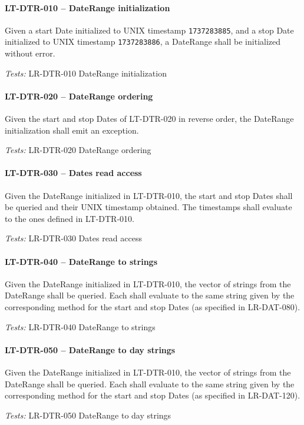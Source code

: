 \paragraph{LT-DTR-010 -- DateRange initialization}
Given a start Date initialized to UNIX timestamp \lstinline{1737283885},
and a stop Date initialized to UNIX timestamp \lstinline{1737283886},
a DateRange shall be initialized without error.

\textit{Tests: } LR-DTR-010 DateRange initialization

\paragraph{LT-DTR-020 -- DateRange ordering}
Given the start and stop Dates of LT-DTR-020 in reverse order,
the DateRange initialization shall emit an exception.

\textit{Tests: } LR-DTR-020 DateRange ordering

\paragraph{LT-DTR-030 -- Dates read access}
Given the DateRange initialized in LT-DTR-010, the start and stop
Dates shall be queried and their UNIX timestamp obtained.
The timestamps shall evaluate to the ones defined in LT-DTR-010.

\textit{Tests: } LR-DTR-030 Dates read access

\paragraph{LT-DTR-040 -- DateRange to strings}
Given the DateRange initialized in LT-DTR-010, the vector of
strings from the DateRange shall be queried. Each shall evaluate
to the same string given by the corresponding method for the start and stop
Dates (as specified in LR-DAT-080).

\textit{Tests: } LR-DTR-040 DateRange to strings

\paragraph{LT-DTR-050 -- DateRange to day strings}
Given the DateRange initialized in LT-DTR-010, the vector of
strings from the DateRange shall be queried. Each shall evaluate
to the same string given by the corresponding method for the start and stop
Dates (as specified in LR-DAT-120).

\textit{Tests: } LR-DTR-050 DateRange to day strings

